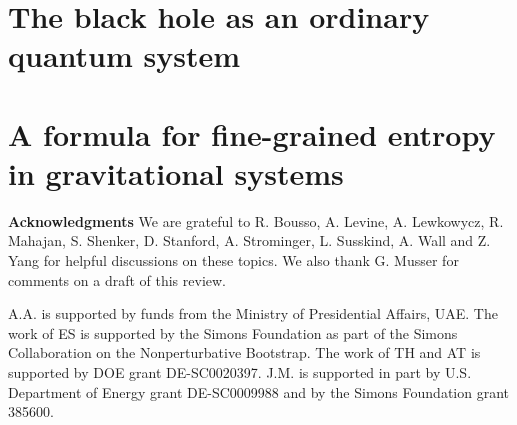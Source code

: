 \documentclass[12pt,oneside]{article}
\numberwithin{equation}{section}
\begin{document}

 

\section{The black hole as an ordinary quantum system} \label{central}


 


\section{A formula for fine-grained entropy in gravitational systems}\label{finegrain}


 


 

 









\vspace{1cm}
\textbf{Acknowledgments} We are grateful to R. Bousso, A. Levine, A. Lewkowycz, R. Mahajan, S. Shenker, D. Stanford, A. Strominger, L. Susskind, A. Wall   and 
 Z. Yang 
for helpful discussions on these topics. We also thank G. Musser for comments on a draft of this review.
 
A.A. is supported by funds from the Ministry of Presidential Affairs, UAE. The work of ES is supported by the Simons Foundation as part of the Simons Collaboration on the Nonperturbative Bootstrap. The work of TH and AT is supported by DOE grant DE-SC0020397.
J.M. is supported in part by U.S. Department of Energy grant DE-SC0009988 and by the Simons Foundation grant 385600.

  \appendix
  
  
\small

 
\end{document}
